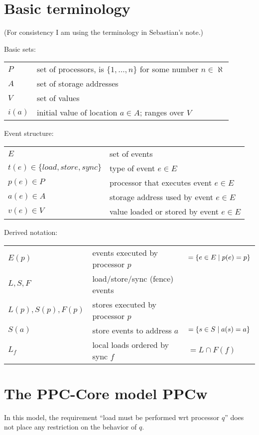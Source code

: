 \documentclass[10pt]{article}
\def\withmmode#1{\relax\ifmmode#1\else{$#1$}\fi}
\def\alt{\withmmode{\;{\tt\char`\|}\;}}
\begin{document}
\section{Basic terminology}

(For consistency I am using the terminology in Sebastian's note.)

Basic sets:

\begin{tabular}[t]{ll}
 $P$ & set of processors, is $\{1,\ldots, n\}$ for some number $n \in \aleph$\\
 $A$ & set of storage addresses  \\
 $V$ & set of values \\
 $i(a)$ & initial value of location $a\in A$; ranges over $V$\\
\end{tabular}

\noindent Event structure:

\begin{tabular}[t]{ll}
 $E$ & set of events\\
 $t(e) \in \{load,store,sync\}$ & type of event $e\in E$\\
 $p(e)\in P$ & processor that executes event $e \in E$ \\
 $a(e)\in A$ & storage address used by event $e\in E$ \\
 $v(e)\in V$ & value loaded or stored by event $e\in E$\\
\end{tabular}

\noindent Derived notation:

\begin{tabular}[t]{lll}
 $E(p)$ & events executed by processor $p$ &$=\{e\in E\alt p(e)=p\}$\\
 $L,S,F$ & load/store/sync (fence) events & \\
 $L(p),S(p),F(p)$ & stores executed by processor $p$ \\
 $S(a)$ & store events to address $a$ & $=\{s \in S\alt a(s)=a\}$\\
 $L_f$ & local loads ordered by sync $f$ & $=L\cap F(f)$\\
\end{tabular}

\section{The PPC-Core model PPCw }\label{sec:no-remote}
In this model, the requirement ``load must be performed wrt processor
$q$'' does not place any restriction on the behavior of $q$.
\end{document}
